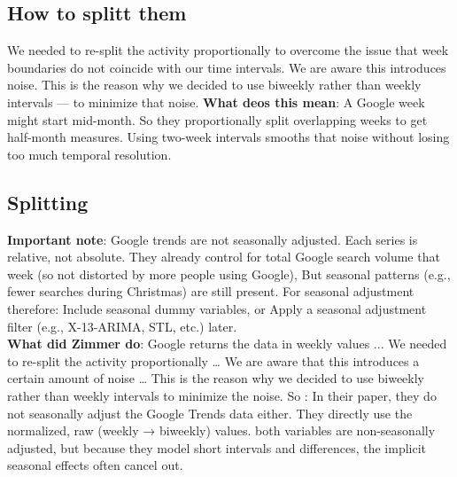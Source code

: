 \documentclass{article}
\begin{document}
\subsection{How to splitt them}
We needed to re-split the activity proportionally to overcome the issue that week boundaries do not coincide with our time intervals. We are aware this introduces noise. This is the reason why we decided to use biweekly rather than weekly intervals — to minimize that noise.
\textbf{What deos this mean}: A Google week might start mid-month.
So they proportionally split overlapping weeks to get half-month measures.
Using two-week intervals smooths that noise without losing too much temporal resolution.

\subsection{Splitting}
\textbf{Important note}: Google trends are not seasonally adjusted. Each series is relative, not absolute. They already control for total Google search volume that week (so not distorted by more people using Google), But seasonal patterns (e.g., fewer searches during Christmas) are still present.
For seasonal adjustment therefore:  Include seasonal dummy variables, or Apply a seasonal adjustment filter (e.g., X-13-ARIMA, STL, etc.) later.
\\
\textbf{What did Zimmer do}: Google returns the data in weekly values ... We needed to re-split the activity proportionally … We are aware that this introduces a certain amount of noise … This is the reason why we decided to use biweekly rather than weekly intervals to minimize the noise.
So : In their paper, they do not seasonally adjust the Google Trends data either. They directly use the normalized, raw (weekly → biweekly) values.
both variables are non-seasonally adjusted, but because they model short intervals and differences, the implicit seasonal effects often cancel out.
\end{document}
